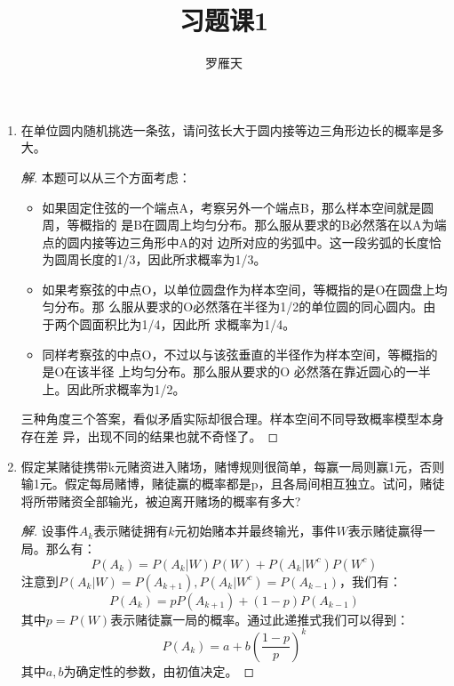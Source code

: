\documentclass[12pt]{article}
\newcommand{\hei}{\CJKfamily{hei}}                          %
\begin{document}
\author{罗雁天}
\title{习题课1}
\maketitle

\medskip

\begin{enumerate}

\item {\hei 在单位圆内随机挑选一条弦，请问弦长大于圆内接等边三角形边长的概率是多大。}
\begin{proof}[解]
	本题可以从三个方面考虑：
	\begin{itemize}
		\item 如果固定住弦的一个端点A，考察另外一个端点B，那么样本空间就是圆周，等概指的 是B在圆周上均匀分布。那么服从要求的B必然落在以A为端点的圆内接等边三角形中A的对 边所对应的劣弧中。这一段劣弧的长度恰为圆周长度的1/3，因此所求概率为1/3。
		\item 如果考察弦的中点O，以单位圆盘作为样本空间，等概指的是O在圆盘上均匀分布。那 么服从要求的O必然落在半径为1/2的单位圆的同心圆内。由于两个圆面积比为1/4，因此所 求概率为1/4。
		\item 同样考察弦的中点O，不过以与该弦垂直的半径作为样本空间，等概指的是O在该半径 上均匀分布。那么服从要求的O 必然落在靠近圆心的一半上。因此所求概率为1/2。
	\end{itemize}
	三种角度三个答案，看似矛盾实际却很合理。样本空间不同导致概率模型本身存在差 异，出现不同的结果也就不奇怪了。
\end{proof}

\item {\hei 假定某赌徒携带k元赌资进入赌场，赌博规则很简单，每赢一局则赢1元，否则输1元。假定每局赌博，赌徒赢的概率都是p，且各局间相互独立。试问，赌徒将所带赌资全部输光，被迫离开赌场的概率有多大?}
\begin{proof}[解]
	设事件$A_k$表示赌徒拥有$k$元初始赌本并最终输光，事件$W$表示赌徒赢得一局。那么有：
	\begin{equation}
	P(A_k)=P(A_k|W)P(W)+P(A_k|W^c)P(W^c)
	\end{equation}
	注意到$P(A_k|W)=P(A_{k+1}),P(A_k|W^c)=P(A_{k-1})$，我们有：
	\begin{equation}
	P(A_k)=pP(A_{k+1})+(1-p)P(A_{k-1})
	\end{equation}
	其中$p=P(W)$表示赌徒赢一局的概率。通过此递推式我们可以得到：
	\begin{equation}
	P(A_k)=a+b\left(\frac{1-p}{p}\right)^k
	\end{equation}
	其中$a,b$为确定性的参数，由初值决定。
	

\end{proof}
\end{enumerate}
\end{document}
